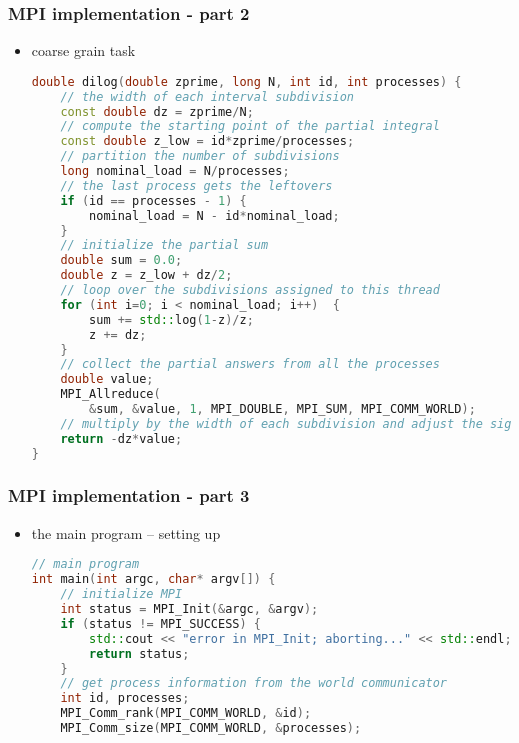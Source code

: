 \begin{frame}[fragile]
%
  \frametitle{MPI implementation - part 2}
%
  \begin{itemize}
  \item coarse grain task
  \begin{lstlisting}[language=c++,name=mpi]
double dilog(double zprime, long N, int id, int processes) {
    // the width of each interval subdivision
    const double dz = zprime/N;
    // compute the starting point of the partial integral
    const double z_low = id*zprime/processes;
    // partition the number of subdivisions
    long nominal_load = N/processes;
    // the last process gets the leftovers
    if (id == processes - 1) {
        nominal_load = N - id*nominal_load;
    }
    // initialize the partial sum
    double sum = 0.0;
    double z = z_low + dz/2;
    // loop over the subdivisions assigned to this thread
    for (int i=0; i < nominal_load; i++)  {
        sum += std::log(1-z)/z;
        z += dz;
    }
    // collect the partial answers from all the processes
    double value;
    MPI_Allreduce(
        &sum, &value, 1, MPI_DOUBLE, MPI_SUM, MPI_COMM_WORLD);
    // multiply by the width of each subdivision and adjust the sign
    return -dz*value;
}
  \end{lstlisting}
%
  \end{itemize}
%
\end{frame}

\begin{frame}[fragile]
%
  \frametitle{MPI implementation - part 3}
%
  \begin{itemize}
  \item the main program -- setting up \mpi
  \begin{lstlisting}[language=c++,name=mpi]
// main program
int main(int argc, char* argv[]) {
    // initialize MPI
    int status = MPI_Init(&argc, &argv);
    if (status != MPI_SUCCESS) {
        std::cout << "error in MPI_Init; aborting..." << std::endl;
        return status;
    }
    // get process information from the world communicator
    int id, processes;
    MPI_Comm_rank(MPI_COMM_WORLD, &id);
    MPI_Comm_size(MPI_COMM_WORLD, &processes);

  \end{lstlisting}
%
  \end{itemize}
%
\end{frame}

